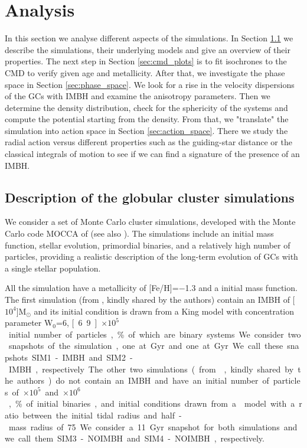 \section{Analysis}\label{sec:analysis}
In this section we analyse different aspects of the simulations. In Section \ref{sec:description} we describe the simulations, their underlying models and give an overview of their properties. The next step in Section \ref{sec:cmd_plots} is to fit isochrones to the \ac{CMD} to verify given age and metallicity. After that, we investigate the phase space in Section \ref{sec:phase_space}. We look for a rise in the velocity dispersions of the \acp{GC} with \ac{IMBH} and examine the anisotropy parameters. Then we determine the density distribution, check for the sphericity of the systems and compute the potential starting from the density. From that, we "translate" the simulation into action space in Section \ref{sec:action_space}. There we study the radial action versus different properties such as the guiding-star distance or the classical integrals of motion to see if we can find a signature of the presence of an \ac{IMBH}.
\subsection{Description of the globular cluster simulations}\label{sec:description}
We consider a set of Monte Carlo cluster simulations, developed with the Monte Carlo
code MOCCA of \citet{2013MNRAS.429.1221H} (see also \citealt{1998MNRAS.298.1239G}). The simulations
include an initial mass function, stellar evolution, primordial binaries, and a
relatively high number of particles, providing a realistic description of the
long-term evolution of \acp{GC} with a single stellar population.
\par All the simulation have a metallicity of [Fe/H]=$-$1.3 and a \citet{2001MNRAS.322..231K} initial mass function. The first simulation (from \citealt{2015MNRAS.454.3150G}, kindly shared by the authors) contain an \ac{IMBH} of \unit[$10^4$]{M$_\odot$} and its initial condition is drawn from a King model with concentration parameter W$_0 $=6, \unit[6.9]{$\times10^5$} initial number of particles, \unit[95]{\%} of which are binary systems. We consider two snapshots of the simulation, one at \unit[10]{Gyr} and one at \unit[7]{Gyr}. We call these snapshots SIM1-IMBH and SIM2-IMBH, respectively. The other two simulations (from \citealt{2010MNRAS.407.1946D}, kindly shared by the authors) do not contain an \ac{IMBH} and have an initial number of particles of \unit[5]{$\times10^5$} and \unit[2]{$\times10^6$}, \unit[10]{\%} of initial binaries, and initial conditions drawn from a \citet{1911MNRAS..71..460P} model with a ratio between the initial tidal radius and half-mass radius of 75. We consider a 11 Gyr snapshot for both simulations and we call them SIM3-NOIMBH and SIM4-NOIMBH, respectively.

